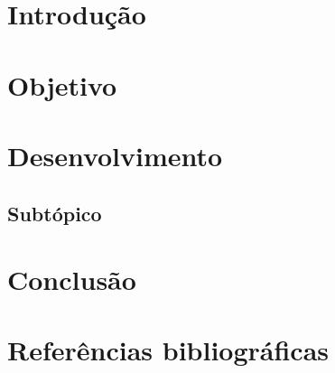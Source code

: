 	\tableofcontents
    \setcounter{page}{2}
	\newpage
    
\section{Introdução}
	\newpage

\section{Objetivo}
	\newpage

\section{Desenvolvimento}
	\subsection{Subtópico}
	\newpage
    
\section{Conclusão}
	\newpage

\section{Referências bibliográficas}


